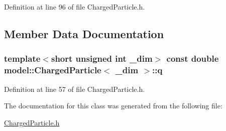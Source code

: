 Definition at line 96 of file Charged\+Particle.\+h.



\subsection{Member Data Documentation}
\hypertarget{classmodel_1_1_charged_particle_a28db4e3ad1c803a36dca08d36bbaae21}{}
\subsubsection[{q}]{\setlength{\rightskip}{0pt plus 5cm}template$<$short unsigned int \+\_\+dim$>$ const double {\bf model\+::\+Charged\+Particle}$<$ \+\_\+dim $>$\+::q}\label{classmodel_1_1_charged_particle_a28db4e3ad1c803a36dca08d36bbaae21}


Definition at line 57 of file Charged\+Particle.\+h.



The documentation for this class was generated from the following file\+:\begin{DoxyCompactItemize}
\item 
\hyperlink{_charged_particle_8h}{Charged\+Particle.\+h}\end{DoxyCompactItemize}
